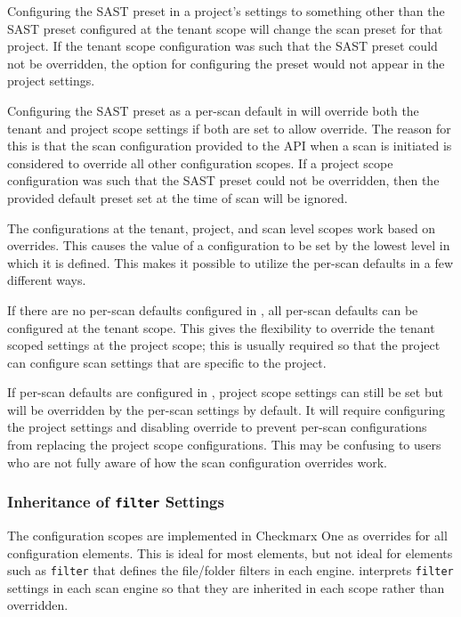 Configuring the SAST preset in a project's settings to something other than
the SAST preset configured at the tenant scope will change the scan preset for that project.
If the tenant scope configuration was such that the SAST preset could not be overridden, the
option for configuring the preset would not appear in the project settings.

Configuring the SAST preset as a per-scan default in \cxoneflow will override both
the tenant and project scope settings if both are set to allow override.  The reason for this
is that the scan configuration provided to the API when a scan is initiated is considered to override
all other configuration scopes.  If a project scope configuration was such that the SAST preset could
not be overridden, then the \cxoneflow provided default preset set at the time of scan will be ignored.

The configurations at the tenant, project, and scan level scopes work based on overrides.
This causes the value of a configuration to be set by the lowest level in which it is
defined. This makes it possible to utilize the \cxoneflow per-scan defaults in a few
different ways.

If there are no per-scan defaults configured in \cxoneflow, all per-scan defaults
can be configured at the tenant scope.  This gives the flexibility to override 
the tenant scoped settings at the project scope; this is usually required so that
the project can configure scan settings that are specific to the project.

If per-scan defaults are configured in \cxoneflow, project scope settings can
still be set but will be overridden by the per-scan settings by default.  It will require
configuring the project settings and disabling override to prevent \cxoneflow per-scan
configurations from replacing the project scope configurations.  This may be confusing
to users who are not fully aware of how the scan configuration overrides work.

\subsubsection{\cxoneflow Inheritance of \texttt{filter} Settings}

The configuration scopes are implemented in Checkmarx One as overrides for all
configuration elements.  This is ideal for most elements, but not ideal for elements
such as \texttt{filter} that defines the file/folder filters in each engine.  \cxoneflow
interprets \texttt{filter} settings in each scan engine so that they are inherited
in each scope rather than overridden.

